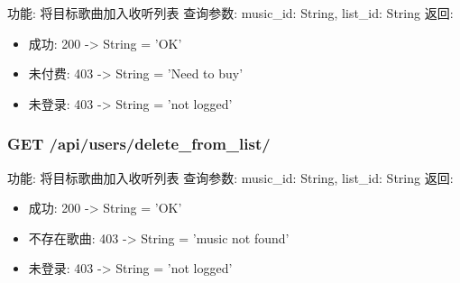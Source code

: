 \begin{enumerate}
\noindent
功能: 将目标歌曲加入收听列表
查询参数:  music\_id: String, list\_id: String
返回:
\begin{itemize}
	\item 成功:  200 -> String = 'OK'
	\item 未付费:  403 -> String = 'Need to buy'
	\item 未登录:  403 -> String = 'not logged'
\end{itemize}


\subsubsection{GET /api/users/delete\_from\_list/}

\noindent
功能: 将目标歌曲加入收听列表
查询参数:  music\_id: String, list\_id: String
返回:
\begin{itemize}
	\item 成功:  200 -> String = 'OK'
	\item 不存在歌曲:  403 -> String = 'music not found'
	\item 未登录:  403 -> String = 'not logged'
\end{itemize}




\end{enumerate}
